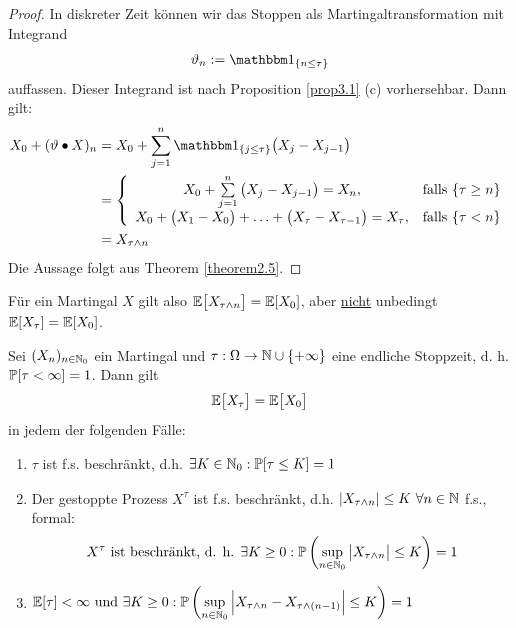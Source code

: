 \begin{proof}
	In diskreter Zeit können wir das Stoppen als Martingaltransformation mit Integrand
	\begin{align*}
		\vartheta_n:=\indi_{\lbrace n\leq\tau\rbrace}
	\end{align*}
	auffassen. Dieser Integrand ist nach Proposition \ref{prop3.1} (c) vorhersehbar. Dann gilt:
	\begin{align*}
		X_0+(\vartheta\bullet X)_n&=
		X_0+\sum\limits_{j=1}^n\indi_{\lbrace j\leq\tau\rbrace}\big(X_j-X_{j-1}\big)\\
		&=\left\lbrace\begin{array}{cl}
			X_0+\sum\limits_{j=1}^n\big(X_j-X_{j-1}\big)=X_n,&\falls\lbrace\tau\geq n\rbrace\\
			X_0+\big(X_1-X_0\big)+\ldots+\big(X_\tau-X_{\tau-1}\big)=X_\tau, &\falls \lbrace\tau<n\rbrace
		\end{array}\right.\\
		&=X_{\tau\wedge n}
	\end{align*}
	Die Aussage folgt aus Theorem \ref{theorem2.5}.
\end{proof}

\begin{bemerkung}
	Für ein Martingal $X$ gilt also $\E\big[X_{\tau\wedge n}\big]=\E[X_0]$, aber \ul{nicht} unbedingt $\E[X_\tau]=\E[X_0]$.
\end{bemerkung}

\begin{theorem}\enter\label{theorem3.3}
	Sei $(X_n)_{n\in\N_0}$ ein Martingal und $\tau:\Omega\to\N\cup\lbrace+\infty\rbrace$ eine endliche Stoppzeit, d. h. $\P[\tau<\infty]=1$. Dann gilt
	\begin{align}\label{eqTheorem3.3}
		\E\big[X_\tau\big]=\E\big[X_0\big]
	\end{align}
	in jedem der folgenden Fälle:
	\begin{enumerate}[label=\alph*)]
		\item $\tau$ ist f.s. beschränkt, d.h.
		$\begin{aligned}
			\exists K\in\N_0:\P[\tau\leq K]=1
		\end{aligned}$
		\item Der gestoppte Prozess $X^\tau$ ist f.s. beschränkt, d.h.
		$|X_{\tau\wedge n}|\leq K~\forall n\in\N$ f.s., formal:
		\begin{align*}
			X^\tau\text{ ist beschränkt, d. h. }\exists K\geq0:\P\left(\sup\limits_{n\in\N_0}\big| X_{\tau\wedge n}\big|\leq K\right)=1
		\end{align*}
		\item $\begin{aligned}
			\E[\tau]<\infty\text{ und }\exists K\geq0:\P\left(\sup\limits_{n\in\N_0}\Big|X_{\tau\wedge n}-X_{\tau\wedge(n-1)}\Big|\leq K\right)=1
		\end{aligned}$
	\end{enumerate}
\end{theorem}

